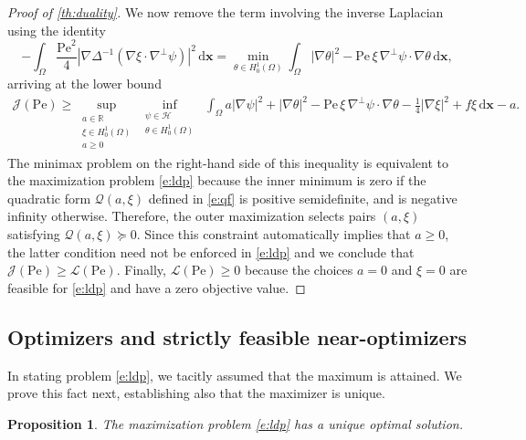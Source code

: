 \documentclass[a4paper, 10pt]{amsart}
\numberwithin{equation}{section}
\theoremstyle{plain}
\newtheorem{proposition}[theorem]{Proposition}
\theoremstyle{definition}
\theoremstyle{remark}
\newcommand{\cal}[1]{\mathcal{#1}}
\newcommand{\R}{\mathbb{R}}
\newcommand{\Pe}{\mathrm{Pe}}
\newcommand{\QF}{\mathcal{Q}}
\renewcommand{\vec}[1]{\mathbf{#1}}
\newcommand{\abs}[1]{\left\vert #1 \right\vert}
\newcommand{\dx}{\mathrm{d} \vec{x}}
\newcommand{\invlap}{\Delta^{-1}}
\newcommand{\avg}[1]{\int_\Omega #1 \,\dx}
\newcommand{\ocpval}{\mathcal{J}}
\newcommand{\lb}{\mathcal{L}}
\begin{document}
\begin{proof}[Proof of \cref{th:duality}]
    We now remove the term involving the inverse Laplacian using the identity 
    \begin{equation*}
        -\avg{ \frac{\Pe^2}{4} \abs{\nabla \invlap(\nabla \xi \cdot \nabla^\perp \psi)}^2 } = \min_{\theta \in H^1_0(\Omega)} \avg{ \abs{\nabla\theta}^2 - \Pe\,\xi\,\nabla^\perp \psi \cdot \nabla\theta },
    \end{equation*}
    arriving at the lower bound
    \begin{align*}
        \ocpval(\Pe)
        \geq 
        \sup_{\substack{a \in \R \\ \xi \in H^1_0(\Omega) \\ a\geq 0}}
        \inf_{\substack{ %
        \psi \in \cal{H} \\ 
        \theta \in H^1_0(\Omega)
        }}\; %
        \avg{a\abs{\nabla\psi}^2 + \abs{\nabla\theta}^2 - \Pe\,\xi\,\nabla^\perp\psi \cdot \nabla\theta - \frac14 \abs{\nabla \xi}^2 + f\xi} - a.
    \end{align*}
    The minimax problem on the right-hand side of this inequality is equivalent to the maximization problem \cref{e:ldp} because the inner minimum is zero if the quadratic form $\QF(a,\xi)$ defined in \cref{e:qf} is positive semidefinite, and is negative infinity otherwise. Therefore, the outer maximization selects pairs $(a,\xi)$ satisfying $\QF(a,\xi)\succeq 0$. Since this constraint automatically implies that $a\geq 0$, the latter condition need not be enforced in \cref{e:ldp} and we conclude that $\ocpval(\Pe) \geq \lb(\Pe)$. Finally, $\lb(\Pe)\geq 0$ because the choices $a=0$ and $\xi=0$ are feasible for \cref{e:ldp} and have a zero objective value.
\end{proof}


\subsection{Optimizers and strictly feasible near-optimizers}\label{ss:well-posedness}
In stating problem \cref{e:ldp}, we tacitly assumed that the maximum is attained. We prove this fact next, establishing also that the maximizer is unique.

\begin{proposition}\label{prop:ldp-well-posed}
    The maximization problem \cref{e:ldp} has a unique optimal solution.
\end{proposition}
\end{document}
